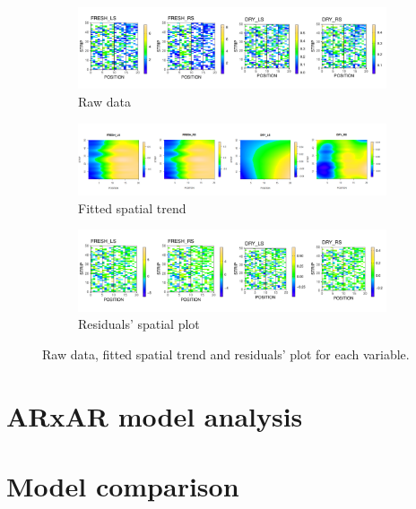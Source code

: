\begin{figure}
	\begin{subfigure}[t]{\textwidth}
		\centering
		\includegraphics[width = \textwidth]{../../Figures/rawData_plot.pdf}
		\caption{Raw data}
	\end{subfigure}
	
	\begin{subfigure}[t]{\textwidth}
		\centering
		\includegraphics[width = \textwidth]{../../Figures/fitted.png}
		\caption{Fitted spatial trend}
	\end{subfigure}
	
	\begin{subfigure}[t]{\textwidth}
		\centering
		\includegraphics[width = \textwidth]{../../Figures/residuals_plot.pdf}
		\caption{Residuals' spatial plot}
	\end{subfigure}
	\caption{Raw data, fitted spatial trend and residuals' plot for each variable.}
	\label{fig:spats_model_results}
\end{figure}

\section{ARxAR model analysis}
\section{Model comparison}
